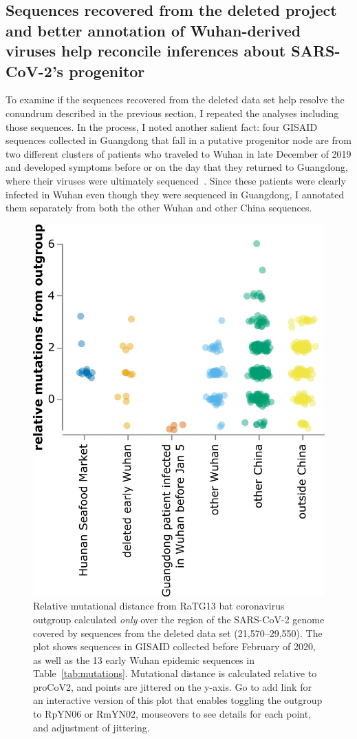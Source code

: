 \documentclass[9pt,twocolumn,twoside]{gsajnl_modified}
\begin{document}
\subsection{Sequences recovered from the deleted project and better annotation of Wuhan-derived viruses help reconcile inferences about SARS-CoV-2's progenitor}
To examine if the sequences recovered from the deleted data set help resolve the conundrum described in the previous section, I repeated the analyses including those sequences.
In the process, I noted another salient fact: four GISAID sequences collected in Guangdong that fall in a putative progenitor node are from two different clusters of patients who traveled to Wuhan in late December of 2019 and developed symptoms before or on the day that they returned to Guangdong, where their viruses were ultimately sequenced~\citep{chan2020familial, kang2020evidence}.
Since these patients were clearly infected in Wuhan even though they were sequenced in Guangdong, I annotated them separately from both the other Wuhan and other China sequences.

\begin{figure}
\centering
\includegraphics[width=0.75\linewidth]{figures/deltadist_jitter.png}
\caption{
Relative mutational distance from RaTG13 bat coronavirus outgroup calculated \emph{only} over the region of the SARS-CoV-2 genome covered by sequences from the deleted data set (21,570--29,550).
The plot shows sequences in GISAID collected before February of 2020, as well as the 13 early Wuhan epidemic sequences in Table~\ref{tab:mutations}.
Mutational distance is calculated relative to proCoV2, and points are jittered on the y-axis.
Go to {\color{red} add link} for an interactive version of this plot that enables toggling the outgroup to RpYN06 or RmYN02, mouseovers to see details for each point, and adjustment of jittering.
\label{fig:deltadist_jitter}
}
\end{figure}
\end{document}
